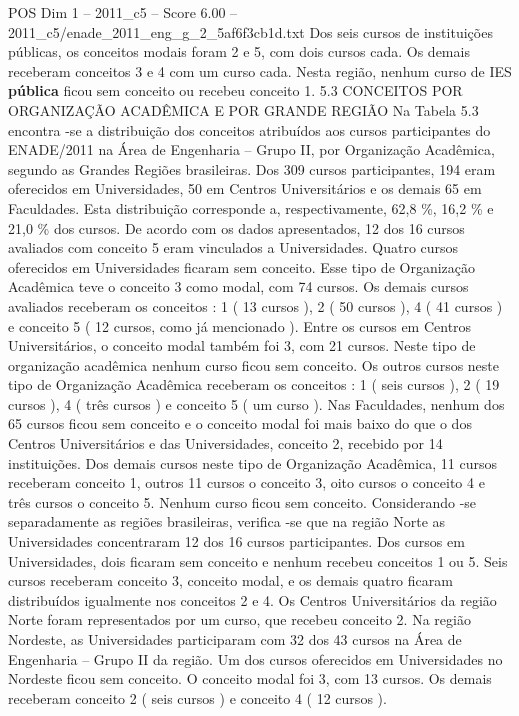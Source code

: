 \begin{textsample}{POS Dim 1 – 2011\_c5 – Score 6.00 – 2011\_c5/enade\_2011\_eng\_g\_2\_5af6f3cb1d.txt}
Dos seis cursos de instituições públicas, os conceitos modais foram 2 e 5, com dois cursos cada.
Os demais receberam conceitos 3 e 4 com um curso cada.
Nesta região, nenhum curso de IES \textbf{pública} ficou sem conceito ou recebeu conceito 1. 5.3 CONCEITOS POR ORGANIZAÇÃO ACADÊMICA E POR GRANDE REGIÃO Na Tabela 5.3 encontra -se a distribuição dos conceitos atribuídos aos cursos participantes do ENADE/2011 na Área de Engenharia – Grupo II, por Organização Acadêmica, segundo as Grandes Regiões brasileiras.
Dos 309 cursos participantes, 194 eram oferecidos em Universidades, 50 em Centros Universitários e os demais 65 em Faculdades.
Esta distribuição corresponde a, respectivamente, 62,8 \%, 16,2 \% e 21,0 \% dos cursos.
De acordo com os dados apresentados, 12 dos 16 cursos avaliados com conceito 5 eram vinculados a Universidades.
Quatro cursos oferecidos em Universidades ficaram sem conceito.
Esse tipo de Organização Acadêmica teve o conceito 3 como modal, com 74 cursos.
Os demais cursos avaliados receberam os conceitos : 1 ( 13 cursos ), 2 ( 50 cursos ), 4 ( 41 cursos ) e conceito 5 ( 12 cursos, como já mencionado ).
Entre os cursos em Centros Universitários, o conceito modal também foi 3, com 21 cursos.
Neste tipo de organização acadêmica nenhum curso ficou sem conceito.
Os outros cursos neste tipo de Organização Acadêmica receberam os conceitos : 1 ( seis cursos ), 2 ( 19 cursos ), 4 ( três cursos ) e conceito 5 ( um curso ).
Nas Faculdades, nenhum dos 65 cursos ficou sem conceito e o conceito modal foi mais baixo do que o dos Centros Universitários e das Universidades, conceito 2, recebido por 14 instituições.
Dos demais cursos neste tipo de Organização Acadêmica, 11 cursos receberam conceito 1, outros 11 cursos o conceito 3, oito cursos o conceito 4 e três cursos o conceito 5.
Nenhum curso ficou sem conceito.
Considerando -se separadamente as regiões brasileiras, verifica -se que na região Norte as Universidades concentraram 12 dos 16 cursos participantes.
Dos cursos em Universidades, dois ficaram sem conceito e nenhum recebeu conceitos 1 ou 5.
Seis cursos receberam conceito 3, conceito modal, e os demais quatro ficaram distribuídos igualmente nos conceitos 2 e 4.
Os Centros Universitários da região Norte foram representados por um curso, que recebeu conceito 2.
Na região Nordeste, as Universidades participaram com 32 dos 43 cursos na Área de Engenharia – Grupo II da região.
Um dos cursos oferecidos em Universidades no Nordeste ficou sem conceito.
O conceito modal foi 3, com 13 cursos.
Os demais receberam conceito 2 ( seis cursos ) e conceito 4 ( 12 cursos ).

\end{textsample}
